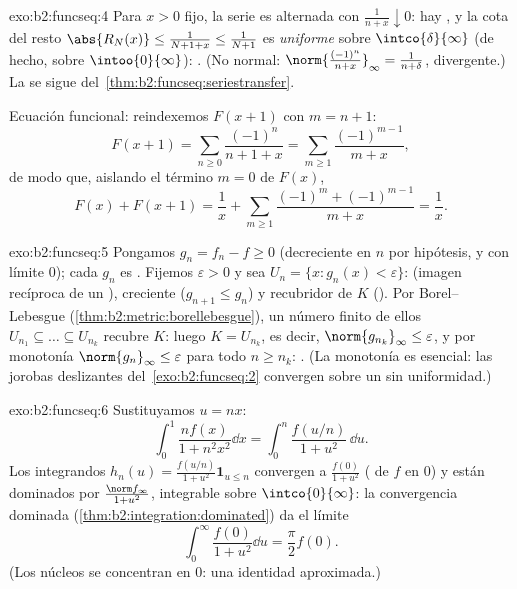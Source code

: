 \begin{solution}{exo:b2:funcseq:4}
Para $x > 0$ fijo, la serie es alternada con $\frac{1}{n + x}
\downarrow 0$: hay , y la cota del resto
$\abs{R_N(x)} \leq \frac{1}{N + 1 + x} \leq \frac{1}{N+1}$ es
\emph{uniforme} sobre $\intco{\delta}{\infty}$ (de hecho, sobre
$\intoo{0}{\infty}$): . (No normal:
$\norm{\frac{(-1)^n}{n+x}}_\infty = \frac{1}{n + \delta}$,
divergente.) La  se sigue del~\cref{thm:b2:funcseq:seriestransfer}.

Ecuación funcional: reindexemos $F(x + 1)$ con $m = n + 1$:
\[
F(x+1) = \sum_{n\geq0} \frac{(-1)^n}{n + 1 + x}
= \sum_{m\geq1}\frac{(-1)^{m-1}}{m+x} ,
\]
de modo que, aislando el término $m = 0$ de $F(x)$,
\[
F(x) + F(x+1)
= \frac{1}{x} + \sum_{m\geq1}
\frac{(-1)^m + (-1)^{m-1}}{m+x} = \frac1x .
\]
\end{solution}

\begin{solution}{exo:b2:funcseq:5}
Pongamos $g_n = f_n - f \geq 0$ (decreciente en $n$ por hipótesis, y
con límite  $0$); cada $g_n$ es . Fijemos
$\varepsilon > 0$ y sea $U_n = \{x : g_n(x) < \varepsilon\}$:
 (imagen recíproca de un ), creciente ($g_{n+1} \leq
g_n$) y recubridor de $K$ (). Por
Borel--Lebesgue (\cref{thm:b2:metric:borellebesgue}), un número
finito de ellos $U_{n_1} \subseteq \dots \subseteq U_{n_k}$ recubre
$K$: luego $K = U_{n_k}$, es decir, $\norm{g_{n_k}}_\infty \leq
\varepsilon$, y por monotonía $\norm{g_n}_\infty \leq \varepsilon$
para todo $n \geq n_k$: . (La monotonía es
esencial: las jorobas deslizantes del~\cref{exo:b2:funcseq:2}
convergen  sobre un  sin uniformidad.)
\end{solution}

\begin{solution}{exo:b2:funcseq:6}
Sustituyamos $u = nx$:
\[
\int_0^1 \frac{n f(x)}{1 + n^2x^2}\dd x
= \int_0^n \frac{f(u/n)}{1 + u^2}\,\dd u .
\]
Los integrandos $h_n(u) = \frac{f(u/n)}{1+u^2}\mathbf{1}_{u \leq n}$
convergen  a $\frac{f(0)}{1+u^2}$ ( de $f$
en $0$) y están dominados por $\frac{\norm f_\infty}{1 + u^2}$,
integrable sobre $\intco{0}{\infty}$: la convergencia dominada
(\cref{thm:b2:integration:dominated}) da el límite
\[
\int_0^\infty \frac{f(0)}{1 + u^2}\dd u = \frac{\pi}{2} f(0) .
\]
(Los núcleos se concentran en $0$: una identidad aproximada.)
\end{solution}

